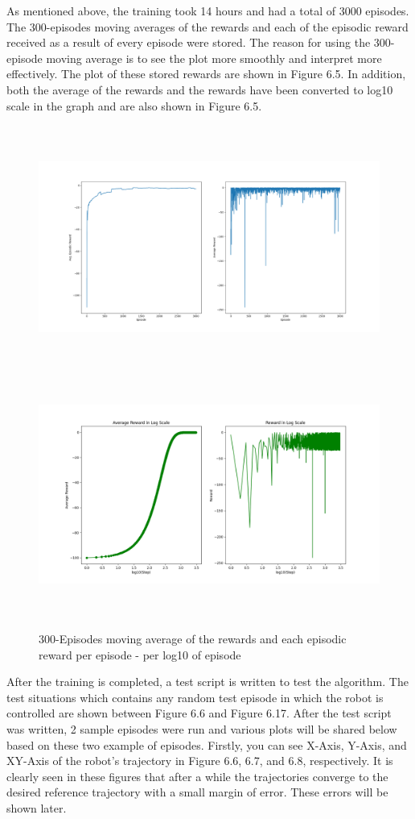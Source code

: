 \documentclass[12pt,twoside,a4]{mwbk}
\begin{document}
\noindent As mentioned above, the training took 14 hours and had a total of 3000 episodes. The 300-episodes moving averages of the rewards and each of the episodic reward received as a result of every episode were stored. The reason for using the 300-episode moving average is to see the plot more smoothly and interpret more effectively. The plot of these stored rewards are shown in Figure 6.5. In addition, both the average of the rewards and the rewards have been converted to log10 scale in the graph and are also shown in Figure 6.5.
\begin{figure}[h]
    \centering
    \includegraphics[width=16cm, height=8cm]{reward.png}
    \includegraphics[width=16cm, height=8cm]{rew_log.png}
    \caption{300-Episodes moving average of the rewards and each episodic reward per episode - per log10 of episode}
\end{figure}
\newpage
\noindent After the training is completed, a test script is written to test the algorithm. The test situations which contains any random test episode in which the robot is controlled are shown between Figure 6.6 and Figure 6.17. After the test script was written, 2 sample episodes were run and various plots will be shared below based on these two example of episodes. Firstly, you can see X-Axis, Y-Axis, and XY-Axis of the robot's trajectory in Figure 6.6, 6.7, and 6.8, respectively. It is clearly seen in these figures that after a while the trajectories converge to the desired reference trajectory with a small margin of error. These errors will be shown later.
\end{document}
